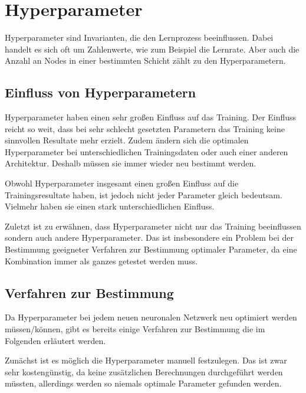 \section{Hyperparameter}

Hyperparameter sind Invarianten, die den Lernprozess beeinflussen.
Dabei handelt es sich oft um Zahlenwerte, wie zum Beispiel die Lernrate.
Aber auch die Anzahl an Nodes in einer bestimmten Schicht zählt zu den Hyperparametern.
\newline

\subsection{Einfluss von Hyperparametern}
Hyperparameter haben einen sehr großen Einfluss auf das Training.
Der Einfluss reicht so weit, dass bei sehr schlecht gesetzten Parametern das Training keine sinnvollen Resultate mehr erzielt.
Zudem ändern sich die optimalen Hyperparameter bei unterschiedlichen Trainingsdaten oder auch einer anderen Architektur.
Deshalb müssen sie immer wieder neu bestimmt werden.

Obwohl Hyperparameter insgesamt einen großen Einfluss auf die Trainingsresultate haben, ist jedoch nicht jeder Parameter gleich bedeutsam.
Vielmehr haben sie einen stark unterschiedlichen Einfluss.

Zuletzt ist zu erwähnen, dass Hyperparameter nicht nur das Training beeinflussen sondern auch andere Hyperparameter.
Das ist insbesondere ein Problem bei der Bestimmung geeigneter Verfahren zur Bestimmung optimaler Parameter, da eine Kombination immer als ganzes getestet werden muss.

\subsection{Verfahren zur Bestimmung}
Da Hyperparameter bei jedem neuen neuronalen Netzwerk neu optimiert werden müssen/können, gibt es bereits einige Verfahren zur Bestimmung die im Folgenden erläutert werden.
\newline

Zunächst ist es möglich die Hyperparameter manuell festzulegen.
Das ist zwar sehr kostengünstig, da keine zusätzlichen Berechnungen durchgeführt werden müssten, allerdings werden so niemals optimale Parameter gefunden werden.
\newline

